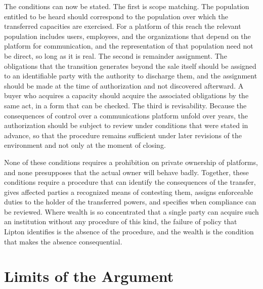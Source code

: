 \documentclass[11pt]{article}
\theoremstyle{definition}
\begin{document}
The conditions can now be stated. The first is scope matching. The population entitled to be heard should correspond to the population over which the transferred capacities are exercised. For a platform of this reach the relevant population includes users, employees, and the organizations that depend on the platform for communication, and the representation of that population need not be direct, so long as it is real. The second is remainder assignment. The obligations that the transition generates beyond the sale itself should be assigned to an identifiable party with the authority to discharge them, and the assignment should be made at the time of authorization and not discovered afterward. A buyer who acquires a capacity should acquire the associated obligations by the same act, in a form that can be checked. The third is revisability. Because the consequences of control over a communications platform unfold over years, the authorization should be subject to review under conditions that were stated in advance, so that the procedure remains sufficient under later revisions of the environment and not only at the moment of closing.

None of these conditions requires a prohibition on private ownership of platforms, and none presupposes that the actual owner will behave badly. Together, these conditions require a procedure that can identify the consequences of the transfer, gives affected parties a recognized means of contesting them, assigns enforceable duties to the holder of the transferred powers, and specifies when compliance can be reviewed. Where wealth is so concentrated that a single party can acquire such an institution without any procedure of this kind, the failure of policy that Lipton identifies is the absence of the procedure, and the wealth is the condition that makes the absence consequential.

\section{Limits of the Argument}
\end{document}
